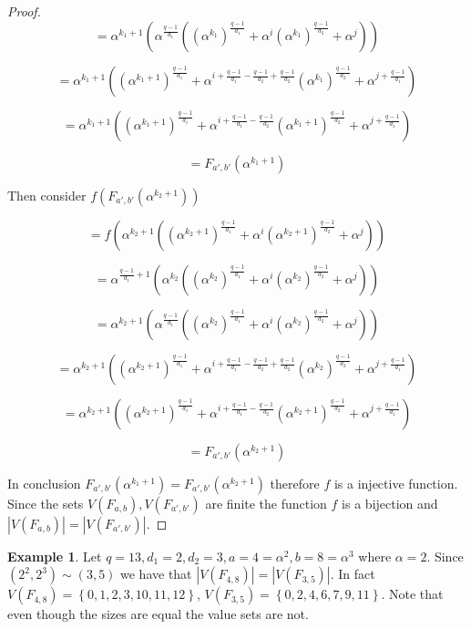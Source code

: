 \documentclass{article}
\theoremstyle{definition}
\newtheorem{example}[theorem]{Example}
\theoremstyle{remark}
\numberwithin{equation}{section}
\begin{document}
\begin{proof}
  $$= \alpha^{k_1+1}(\alpha^{\frac{q-1}{d_1}}((\alpha^{k_1})^{\frac{q-1}{d_1}} + \alpha^{i}(\alpha^{k_1})^{\frac{q-1}{d_2}} + \alpha^{j}))$$ 

  $$= \alpha^{k_1+1}((\alpha^{k_1+1})^{\frac{q-1}{d_1}} + \alpha^{i + \frac{q-1}{d_1} - \frac{q-1}{d_2} + \frac{q-1}{d_2}}(\alpha^{k_1})^{\frac{q-1}{d_2}} + \alpha^{j + \frac{q-1}{d_1}})$$

  $$= \alpha^{k_1+1}((\alpha^{k_1+1})^{\frac{q-1}{d_1}} + \alpha^{i + \frac{q-1}{d_1} - \frac{q-1}{d_2}}(\alpha^{k_1+1})^{\frac{q-1}{d_2}} + \alpha^{j + \frac{q-1}{d_1}})$$ 

  $$= F_{a', b'}(\alpha^{k_1+1})$$

  Then consider $f(F_{a', b'}(\alpha^{k_2+1}))$

  $$= f(\alpha^{k_2+1}((\alpha^{k_2+1})^{\frac{q-1}{d_1}} + \alpha^{i}(\alpha^{k_2+1})^{\frac{q-1}{d_2}} + \alpha^{j}))$$

  $$ = \alpha^{\frac{q-1}{d_1}+1}(\alpha^{k_2}((\alpha^{k_2})^{\frac{q-1}{d_1}} + \alpha^{i}(\alpha^{k_2})^{\frac{q-1}{d_2}} + \alpha^{j}))$$

  $$ = \alpha^{k_2+1}(\alpha^{\frac{q-1}{d_1}}((\alpha^{k_2})^{\frac{q-1}{d_1}} + \alpha^{i}(\alpha^{k_2})^{\frac{q-1}{d_2}} + \alpha^{j}))$$

  $$ = \alpha^{k_2+1}((\alpha^{k_2 + 1})^{\frac{q-1}{d_1}} + \alpha^{i + \frac{q-1}{d_1} - \frac{q-1}{d_2} + \frac{q-1}{d_2}}(\alpha^{k_2})^{\frac{q-1}{d_2}} + \alpha^{j + \frac{q-1}{d_1}})$$

  $$= \alpha^{k_2+1}((\alpha^{k_2 + 1})^{\frac{q-1}{d_1}} + \alpha^{i + \frac{q-1}{d_1} - \frac{q-1}{d_2}}(\alpha^{k_2 + 1})^{\frac{q-1}{d_2}} + \alpha^{j + \frac{q-1}{d_1}})$$

  $$= F_{a', b'}(\alpha^{k_2+1})$$

  In conclusion $F_{a', b'}(\alpha^{k_1+1}) = F_{a', b'}(\alpha^{k_2+1})$ therefore $f$ is a injective function. Since the sets $V(F_{a,b}), V(F_{a',b'})$ are finite the function $f$ is a bijection and $|V(F_{a,b})| = |V(F_{a',b'})|$.

\end{proof}

 \begin{example}
    Let $q = 13, d_1 = 2, d_2 = 3, a = 4 = \alpha^2, b = 8 = \alpha^3 $ where $\alpha = 2$. Since $(2^2,2^3) \sim (3,5)$ we have that $|V(F_{4, 8})| = |V(F_{3, 5})|$. In fact $V(F_{4, 8}) = \left\{0, 1, 2, 3, 10, 11, 12\right\}$, $V(F_{3, 5}) = \left\{0, 2, 4, 6, 7, 9, 11\right\}$. Note that even though the sizes are equal the value sets are not.
  \end{example}
\end{document}
